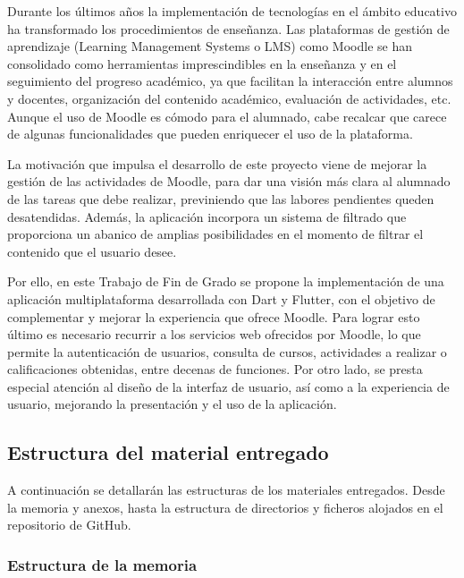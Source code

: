 
Durante los últimos años la implementación de tecnologías en el ámbito educativo ha transformado los procedimientos de enseñanza. Las plataformas de gestión de aprendizaje (Learning Management Systems o LMS) como Moodle se han consolidado como herramientas imprescindibles en la enseñanza y en el seguimiento del progreso académico, ya que facilitan la interacción entre alumnos y docentes, organización del contenido académico, evaluación de actividades, etc. Aunque el uso de Moodle es cómodo para el alumnado, cabe recalcar que carece de algunas funcionalidades que pueden enriquecer el uso de la plataforma.

La motivación que impulsa el desarrollo de este proyecto viene de mejorar la gestión de las actividades de Moodle, para dar una visión más clara al alumnado de las tareas que debe realizar, previniendo que las labores pendientes queden desatendidas. Además, la aplicación incorpora un sistema de filtrado que proporciona un abanico de amplias posibilidades en el momento de filtrar el contenido que el usuario desee.

Por ello, en este Trabajo de Fin de Grado se propone la implementación de una aplicación multiplataforma desarrollada con Dart y Flutter, con el objetivo de complementar y mejorar la experiencia que ofrece Moodle. Para lograr esto último es necesario recurrir a los servicios web ofrecidos por Moodle, lo que permite la autenticación de usuarios, consulta de cursos, actividades a realizar o calificaciones obtenidas, entre decenas de funciones. Por otro lado, se presta especial atención al diseño de la interfaz de usuario, así como a la experiencia de usuario, mejorando la presentación y el uso de la aplicación.

\subsection{Estructura del material entregado}
A continuación se detallarán las estructuras de los materiales entregados. Desde la memoria y anexos, hasta la estructura de directorios y ficheros alojados en el repositorio de GitHub.

\subsubsection{Estructura de la memoria}

